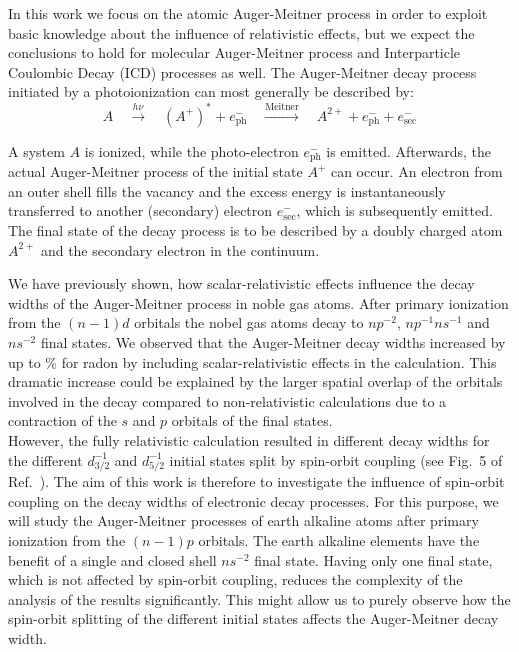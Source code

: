 In this work we focus on the atomic Auger-Meitner process     
in order                                      
to exploit basic knowledge about the influence of relativistic effects,
but we expect the conclusions to hold for molecular Auger-Meitner process and
Interparticle Coulombic Decay (ICD) processes
\cite{Cederbaum97,Marburger03,Hergenhahn11,Jahnke15} as well.
The Auger-Meitner decay process initiated by a photoionization
can most generally be described by:
\begin{equation*}                                               
 A \quad \xrightarrow{h\nu}\quad (A^+)^* + e^-_\text{ph} \quad       
    \xrightarrow{\text{Meitner}} \quad A^{2+} + e^-_\text{ph} + e^-_\text{sec}     
\end{equation*}                                                 
                                                                
A system $A$ is ionized, while the photo-electron $e^-_\text{ph}$ is emitted.      
Afterwards, the actual Auger-Meitner
process of the initial state $A^+$ can occur.    
An electron from an outer                                       
shell fills the vacancy and the excess energy is instantaneously transferred  
to another (secondary) electron $e^-_\text{sec}$, which
is subsequently emitted. The final state of the decay process   
is to be described by a doubly charged atom $A^{2+}$ and the secondary        
electron in the continuum.

We have previously shown, how
scalar-relativistic effects influence the decay widths of the Auger-Meitner
process in
noble gas atoms. \cite{Fasshauer15_1}
After primary ionization from the $(n-1)d$ orbitals the nobel
gas atoms decay to $np^{-2}$, $np^{-1}ns^{-1}$ and $ns^{-2}$ final states.
We observed that the Auger-Meitner decay widths increased by up to \unit[326]{\%}
for radon
by including scalar-relativistic effects in the calculation. This
dramatic increase could be explained by the larger spatial
overlap of the orbitals
involved in the decay compared to non-relativistic calculations due to
a contraction of the $s$ and $p$ orbitals of the final states.\\
However, the fully relativistic calculation resulted in different decay widths
for the different $d_{3/2}^{-1}$ and $d_{5/2}^{-1}$ initial states split by
spin-orbit coupling (see Fig.~5 of Ref.~\cite{Fasshauer15_1}).
The aim of this work is therefore to investigate the
influence of spin-orbit coupling on the decay widths of electronic decay processes.
For this purpose, we will study the Auger-Meitner processes of earth alkaline atoms
after primary ionization from the $(n-1)p$ orbitals. The earth alkaline elements
have the benefit of a single and closed shell $ns^{-2}$ final state.
Having only one final state, which is not affected by spin-orbit coupling,
reduces the complexity of the analysis of the results significantly.
This might allow us to purely observe how the spin-orbit splitting of
the different initial states affects the Auger-Meitner decay width.


